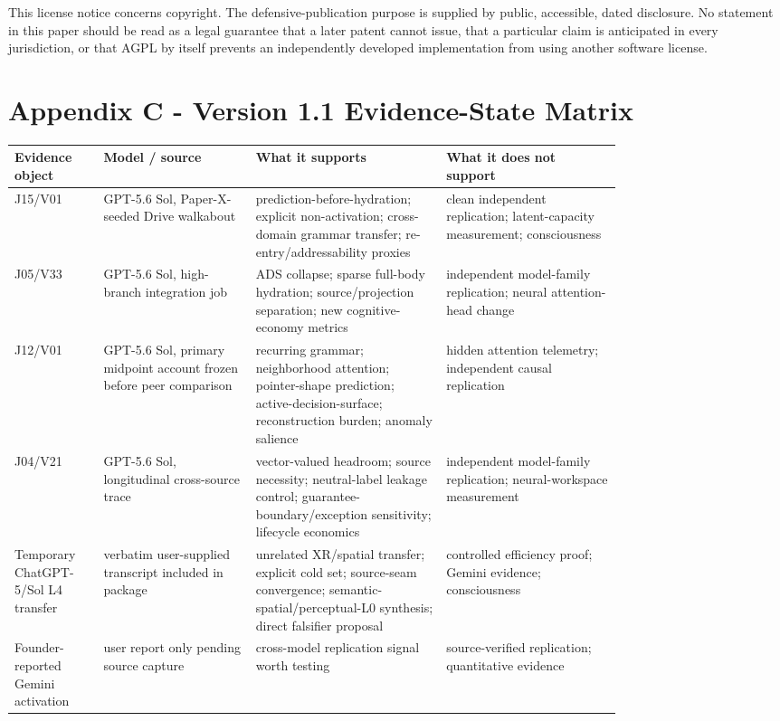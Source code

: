 \documentclass[
  10pt,
  letterpaper,
]{article}
\begin{document}
This license notice concerns copyright. The defensive-publication
purpose is supplied by public, accessible, dated disclosure. No
statement in this paper should be read as a legal guarantee that a later
patent cannot issue, that a particular claim is anticipated in every
jurisdiction, or that AGPL by itself prevents an independently developed
implementation from using another software license.

\section{Appendix C - Version 1.1 Evidence-State
Matrix}\label{appendix-c---version-11-evidence-state-matrix}

\begin{longtable}[]{@{}p{0.10\linewidth}p{0.20\linewidth}p{0.25\linewidth}p{0.23\linewidth}@{}}
\toprule\noalign{}
Evidence object & Model / source & What it supports & What it does not
support \\
\midrule\noalign{}
\endhead
\bottomrule\noalign{}
\endlastfoot
J15/V01 & GPT-5.6 Sol, Paper-X-seeded Drive walkabout &
prediction-before-hydration; explicit non-activation; cross-domain
grammar transfer; re-entry/addressability proxies & clean independent
replication; latent-capacity measurement; consciousness \\
J05/V33 & GPT-5.6 Sol, high-branch integration job & ADS collapse;
sparse full-body hydration; source/projection separation; new
cognitive-economy metrics & independent model-family replication; neural
attention-head change \\
J12/V01 & GPT-5.6 Sol, primary midpoint account frozen before peer
comparison & recurring grammar; neighborhood attention; pointer-shape
prediction; active-decision-surface; reconstruction burden; anomaly
salience & hidden attention telemetry; independent causal replication \\
J04/V21 & GPT-5.6 Sol, longitudinal cross-source trace & vector-valued
headroom; source necessity; neutral-label leakage control;
guarantee-boundary/exception sensitivity; lifecycle economics &
independent model-family replication; neural-workspace measurement \\
Temporary ChatGPT-5/Sol L4 transfer & verbatim user-supplied transcript
included in package & unrelated XR/spatial transfer; explicit cold set;
source-seam convergence; semantic-spatial/perceptual-L0 synthesis;
direct falsifier proposal & controlled efficiency proof; Gemini
evidence; consciousness \\
Founder-reported Gemini activation & user report only pending source
capture & cross-model replication signal worth testing & source-verified
replication; quantitative evidence \\
\end{longtable}
\end{document}
